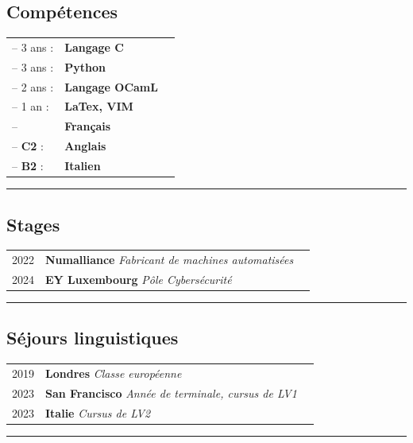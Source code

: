 \documentclass[11pt, a4paper]{article}
\begin{document}
\subsection*{Compétences}

\begin{tabularx}{\textwidth}{@{}l X r@{}}
    -- 3 ans : & \textbf{Langage C}
    \\
    -- 3 ans : & \textbf{Python}
    \\
    -- 2 ans : & \textbf{Langage OCamL} 
    \\
    -- 1 an : & \textbf{LaTex, VIM}
    \\
    -- & \textbf{Français}
    \\
    --  \textbf{C2} : & \textbf{Anglais}
    \\
    -- \textbf{B2} : & \textbf{Italien}
\end{tabularx}

\vspace{2pt}
\rule{\textwidth}{0.4pt}  %

\subsection*{Stages}

\begin{tabularx}{\textwidth}{@{}l X r@{}}
    2022 & \textbf{Numalliance} \quad \textit{Fabricant de machines automatisées}
    \\
    2024 & \textbf{EY Luxembourg} \quad \textit{Pôle Cybersécurité}
\end{tabularx}

\vspace{2pt}
\rule{\textwidth}{0.4pt}  %

\subsection*{Séjours linguistiques}

\begin{tabularx}{\textwidth}{@{}l X r@{}}
    2019 & \textbf{Londres} \quad \textit{Classe européenne}
    \\
    2023 & \textbf{San Francisco} \quad \textit{Année de terminale, cursus de LV1}
    \\
    2023 & \textbf{Italie} \quad \textit{Cursus de LV2}
\end{tabularx}

\vspace{2pt}
\rule{\textwidth}{0.4pt}  %
\end{document}
